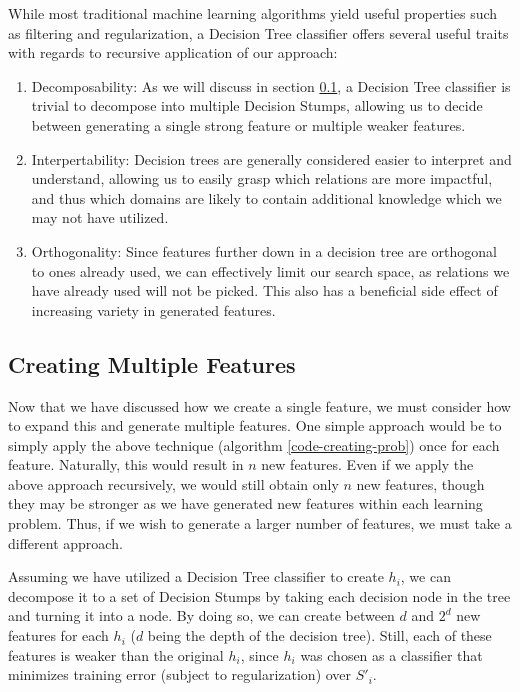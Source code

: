 \documentclass[twoside,11pt]{article}
\theoremstyle{definition}
\begin{document}
While most traditional machine learning algorithms yield useful properties such as filtering and regularization, a Decision Tree classifier offers several useful traits with regards to recursive application of our approach:
\begin{enumerate}
	\item Decomposability: As we will discuss in section \ref{multi_feature}, a Decision Tree classifier is trivial to decompose into multiple Decision Stumps, allowing us to decide between generating a single strong feature or multiple weaker features.
	\item Interpertability: Decision trees are generally considered easier to interpret and understand, allowing us to easily grasp which relations are more impactful, and thus which domains are likely to contain additional knowledge which we may not have utilized.
	\item Orthogonality: Since features further down in a decision tree are orthogonal to ones already used, we can effectively limit our search space, as relations we have already used will not be picked. This also has a beneficial side effect of increasing variety in generated features.
\end{enumerate}

\subsection{Creating Multiple Features} \label{multi_feature}

Now that we have discussed how we create a single feature, we must consider how to expand this and generate multiple features. One simple approach would be to simply apply the above technique (algorithm \ref{code-creating-prob}) once for each feature.
Naturally, this would result in $n$ new features.
Even if we apply the above approach recursively, we would still obtain only $n$ new features, though they may be stronger as we have generated new features within each learning problem.
Thus, if we wish to generate a larger number of features, we must take a different approach.

Assuming we have utilized a Decision Tree classifier to create $h_i$, we can decompose it to a set of Decision Stumps by taking each decision node in the tree and turning it into a node. By doing so, we can create between $d$ and $2^d$ new features for each $h_i$ ($d$ being the depth of the decision tree). Still, each of these features is weaker than the original $h_i$, since $h_i$ was chosen as a classifier that minimizes training error (subject to regularization) over $S'_i$.
\end{document}
